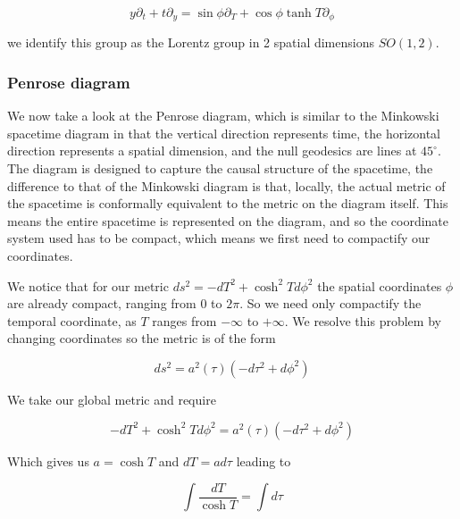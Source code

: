 \documentclass[a4paper,11pt]{article}
\numberwithin{equation}{section}
\numberwithin{figure}{section}
\begin{document}
\begin{large}
\begin{equation}
\label{eq:yboost}
y\partial_t+t\partial_y=\sin\phi \partial_T+\cos\phi\tanh T\partial_\phi
\end{equation}

\vspace{0.5cm}

we identify this group as the Lorentz group in 2 spatial dimensions $SO(1,2)$.


\newpage


\subsubsection{Penrose diagram}

We now take a look at the Penrose diagram, which is similar to the Minkowski spacetime diagram in that the vertical direction represents time, the horizontal direction represents a spatial dimension, and the null geodesics are lines at $45^{\circ}$. The diagram is designed to capture the causal structure of the spacetime, the difference to that of the Minkowski diagram is that, locally, the actual metric of the spacetime is conformally equivalent to the metric on the diagram itself. This means the entire spacetime is represented on the diagram, and so the coordinate system used has to be compact, which means we first need to compactify our coordinates.

We notice that for our metric $ds^2=-dT^2+\cosh^2T d\phi^2$ the spatial coordinates $\phi$ are already compact, ranging from $0$ to $2\pi$. So we need only compactify the temporal coordinate, as $T$ ranges from $-\infty$ to $+\infty$. We resolve this problem by changing coordinates so the metric is of the form

\begin{equation}
\label{Pen_metric_form}
    ds^2=a^2(\tau)(-d\tau^2+d\phi^2)
\end{equation}

We take our global metric and require

\begin{equation}
\label{Glob=Pen}
    -dT^2+\cosh ^2 T d\phi^2=a^2(\tau)(-d\tau^2+d\phi^2)
\end{equation}


Which gives us $a=\cosh T$ and $dT=a d\tau$ leading to

\begin{equation}
\label{Int1}
    \int \frac{dT}{\cosh T}= \int d\tau
\end{equation}


\end{large}
\end{document}
